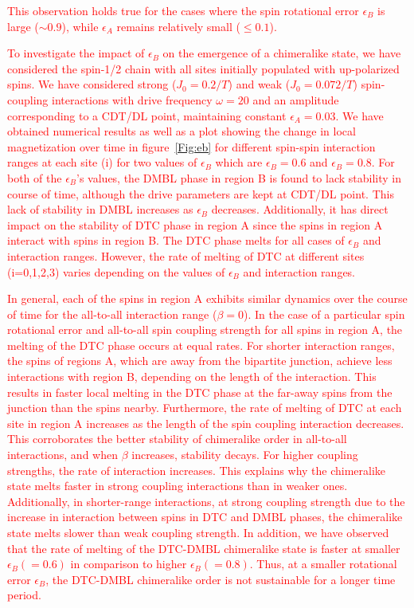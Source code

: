 \documentclass[12pt]{iopart}
\newcommand{\red}[1]{\textcolor{red}{#1}}
\begin{document}
\red{This observation holds true for the cases where the spin rotational error $\epsilon_B$ is large ($\sim 0.9$), while $\epsilon_A$ remains relatively small ($\le 0.1$).}

\red{To investigate the impact of $\epsilon_B$ on the emergence of a chimeralike state, we have considered the spin-1/2 chain with all sites initially populated with up-polarized spins. We have considered strong ($J_0 = 0.2/T$) and weak ($J_0 = 0.072/T$) spin-coupling interactions with drive frequency $\omega = 20$ and an amplitude corresponding to a CDT/DL point, maintaining constant $\epsilon_A=0.03$. We have obtained numerical results as well as a plot showing the change in local magnetization over time in figure~\ref{Fig:eb} for different spin-spin interaction ranges at each site (i) for two values of $\epsilon_B$ which are $\epsilon_B = 0.6$ and $\epsilon_B = 0.8$. For both of the $\epsilon_B$'s values, the DMBL phase in region B is found to lack stability in course of time, although the drive parameters are kept at CDT/DL point. This lack of stability in DMBL increases as $\epsilon_B$ decreases. Additionally, it has direct impact on the stability of DTC phase in region A since the spins in region A interact with spins in region B. The DTC phase melts for all cases of $\epsilon_B$ and interaction ranges. However, the rate of melting of DTC at different sites (i=0,1,2,3) varies depending on the values of $\epsilon_B$ and interaction ranges.}

\red{ In general, each of the spins in region A exhibits similar dynamics over the course of time for the all-to-all interaction range ($\beta=0$). In the case of a particular spin rotational error and all-to-all spin coupling strength for all spins in region A, the melting of the DTC phase occurs at equal rates. For shorter interaction ranges, the spins of regions A, which are away from the bipartite junction, achieve less interactions with region B, depending on the length of the interaction. This results in faster local melting in the DTC phase at the far-away spins from the junction than the spins nearby. Furthermore, the rate of melting of DTC at each site in region A increases as the length of the spin coupling interaction decreases. This corroborates the better stability of chimeralike order in all-to-all interactions, and when $\beta$ increases, stability decays. For higher coupling strengths, the rate of interaction increases. This explains why the chimeralike state melts faster in strong coupling interactions than in weaker ones. Additionally, in shorter-range interactions, at strong coupling strength due to the increase in interaction between spins in DTC and DMBL phases, the chimeralike state melts slower than weak coupling strength. In addition, we have observed that the rate of melting of the DTC-DMBL chimeralike state is faster at smaller $\epsilon_B(=0.6)$ in comparison to higher $\epsilon_B(=0.8)$. Thus, at a smaller rotational error $\epsilon_B$, the DTC-DMBL chimeralike order is not sustainable for a longer time period.}
\end{document}
